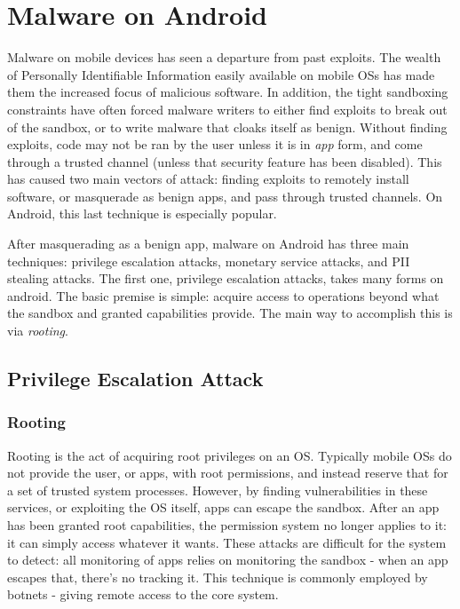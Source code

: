 \chapter{Malware on Android}
\label{sec:malware}

Malware on mobile devices has seen a departure from past exploits. The wealth of Personally Identifiable Information easily available on mobile OSs has made them the increased focus of malicious software. In addition, the tight sandboxing constraints have often forced malware writers to either find exploits to break out of the sandbox, or to write malware that cloaks itself as benign. Without finding exploits, code may not be ran by the user unless it is in \textit{app} form, and come through a trusted channel (unless that security feature has been disabled). This has caused two main vectors of attack: finding exploits to remotely install software, or masquerade as benign apps, and pass through trusted channels. On Android, this last technique is especially popular. 

After masquerading as a benign app, malware on Android has three main techniques: privilege escalation attacks, monetary service attacks, and PII stealing attacks. The first one, privilege escalation attacks, takes many forms on android. The basic premise is simple: acquire access to operations beyond what the sandbox and granted capabilities provide. The main way to accomplish this is via \textit{rooting}.

\section{Privilege Escalation Attack}
\subsection{Rooting}
Rooting is the act of acquiring root privileges on an OS. Typically mobile OSs do not provide the user, or apps, with root permissions, and instead reserve that for a set of trusted system processes. However, by finding vulnerabilities in these services, or exploiting the OS itself, apps can escape the sandbox. After an app has been granted root capabilities, the permission system no longer applies to it: it can simply access whatever it wants. These attacks are difficult for the system to detect: all monitoring of apps relies on monitoring the sandbox - when an app escapes that, there's no tracking it. This technique is commonly employed by botnets - giving remote access to the core system. 

